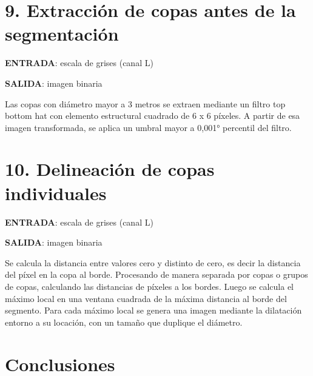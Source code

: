     \hypertarget{extracciuxf3n-de-copas-antes-de-la-segmentaciuxf3n}{%
\section{9. Extracción de copas antes de la
segmentación}\label{extracciuxf3n-de-copas-antes-de-la-segmentaciuxf3n}}

\textbf{ENTRADA}: escala de grises (canal L)

\textbf{SALIDA}: imagen binaria

Las copas con diámetro mayor a 3 metros se extraen mediante un filtro
top bottom hat con elemento estructural cuadrado de 6 x 6 píxeles. A
partir de esa imagen transformada, se aplica un umbral mayor a 0,001°
percentil del filtro.

    \hypertarget{delineaciuxf3n-de-copas-individuales}{%
\section{10. Delineación de copas
individuales}\label{delineaciuxf3n-de-copas-individuales}}

\textbf{ENTRADA}: escala de grises (canal L)

\textbf{SALIDA}: imagen binaria

Se calcula la distancia entre valores cero y distinto de cero, es decir
la distancia del píxel en la copa al borde. Procesando de manera
separada por copas o grupos de copas, calculando las distancias de
píxeles a los bordes. Luego se calcula el máximo local en una ventana
cuadrada de la máxima distancia al borde del segmento. Para cada máximo
local se genera una imagen mediante la dilatación entorno a su locación,
con un tamaño que duplique el diámetro.

    \hypertarget{conclusiones}{%
\section{Conclusiones}\label{conclusiones}}

    


    
    
    
%
